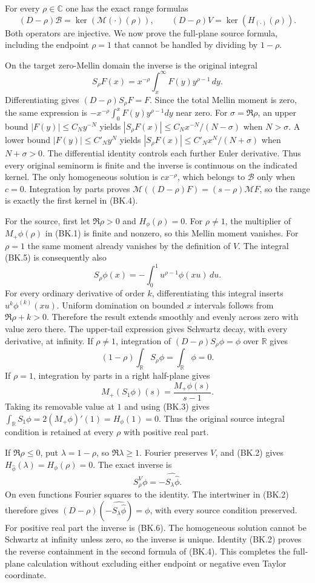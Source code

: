 For every $\rho\in\mathbb C$ one has the exact range formulas
\[
 (D-\rho)\mathscr B=\ker(\mathcal M(\cdot)(\rho)),\qquad
 (D-\rho)V=\ker(H_{(\cdot)}(\rho)).             \tag{BK.4}
\]
Both operators are injective.  We now prove the full-plane source
formula, including the endpoint $\rho=1$ that cannot be handled by
dividing by $1-\rho$.

On the target zero-Mellin domain the inverse is the original integral
\[
 S_\rho F(x)=x^{-\rho}\int_x^\infty F(y)y^{\rho-1}\,dy.
                                                               \tag{BK.5}
\]
Differentiating gives $(D-\rho)S_\rho F=F$.  Since the total Mellin
moment is zero, the same expression is
$-x^{-\rho}\int_0^xF(y)y^{\rho-1}dy$ near zero.  For
$\sigma=\Re\rho$, an upper bound $|F(y)|\le C_Ny^{-N}$ yields
$|S_\rho F(x)|\le C_Nx^{-N}/(N-\sigma)$ when $N>\sigma$.
A lower bound $|F(y)|\le C'_Ny^N$ yields
$|S_\rho F(x)|\le C'_Nx^N/(N+\sigma)$ when $N+\sigma>0$.
The differential identity controls each further Euler derivative.
Thus every original seminorm is finite and the inverse is continuous
on the indicated kernel.  The only homogeneous solution is
$cx^{-\rho}$, which belongs to $\mathscr B$ only when $c=0$.
Integration by parts proves
$\mathcal M((D-\rho)F)=(s-\rho)\mathcal MF$, so the range is
exactly the first kernel in (BK.4).

For the source, first let $\Re\rho>0$ and $H_\phi(\rho)=0$.
For $\rho\ne1$, the multiplier of $M_+\phi(\rho)$ in (BK.1)
is finite and nonzero, so this Mellin moment vanishes.  For $\rho=1$
the same moment already vanishes by the definition of $V$.
The integral (BK.5) is consequently also
\[
 S_\rho\phi(x)=-\int_0^1u^{\rho-1}\phi(xu)\,du. \tag{BK.6}
\]
For every ordinary derivative of order $k$, differentiating this
integral inserts $u^k\phi^{(k)}(xu)$.  Uniform domination on bounded
$x$ intervals follows from $\Re\rho+k>0$.  Therefore the result
extends smoothly and evenly across zero with value zero there.
The upper-tail expression gives Schwartz decay, with every derivative,
at infinity.  If $\rho\ne1$, integration of
$(D-\rho)S_\rho\phi=\phi$ over $\mathbb R$ gives
\[
 (1-\rho)\int_{\mathbb R}S_\rho\phi=\int_{\mathbb R}\phi=0.
\]
If $\rho=1$, integration by parts in a right half-plane gives
\[
 M_+(S_1\phi)(s)=\frac{M_+\phi(s)}{s-1}.
\]
Taking its removable value at $1$ and using (BK.3) gives
$\int_{\mathbb R}S_1\phi=2(M_+\phi)'(1)=H_\phi(1)=0$.
Thus the original source integral condition is retained at every
$\rho$ with positive real part.

If $\Re\rho\le0$, put $\lambda=1-\rho$, so $\Re\lambda\ge1$.
Fourier preserves $V$, and (BK.2) gives
$H_{\widehat\phi}(\lambda)=H_\phi(\rho)=0$.  The exact inverse is
\[
 S_\rho^V\phi=-\widehat{S_\lambda\widehat\phi}. \tag{BK.7}
\]
On even functions Fourier squares to the identity.  The intertwiner
in (BK.2) therefore gives
$(D-\rho)(-\widehat{S_\lambda\widehat\phi})=\phi$,
with every source condition preserved.  For positive real part the
inverse is (BK.6).  The homogeneous solution cannot be Schwartz at
infinity unless zero, so the inverse is unique.  Identity (BK.2)
proves the reverse containment in the second formula of (BK.4).
This completes the full-plane calculation without excluding either
endpoint or negative even Taylor coordinate.

